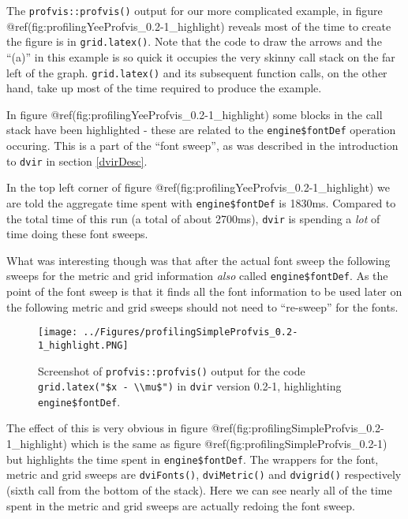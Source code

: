 \documentclass[]{article}
\begin{document}
The \texttt{profvis::profvis()} output for our more complicated example,
in figure @ref(fig:profilingYeeProfvis\_0.2-1\_highlight) reveals most
of the time to create the figure is in \texttt{grid.latex()}. Note that
the code to draw the arrows and the ``(a)'' in this example is so quick
it occupies the very skinny call stack on the far left of the graph.
\texttt{grid.latex()} and its subsequent function calls, on the other
hand, take up most of the time required to produce the example.

In figure @ref(fig:profilingYeeProfvis\_0.2-1\_highlight) some blocks in
the call stack have been highlighted - these are related to the
\texttt{engine\$fontDef} operation occuring. This is a part of the
``font sweep'', as was described in the introduction to \texttt{dvir} in
section \ref{dvirDesc}.

In the top left corner of figure
@ref(fig:profilingYeeProfvis\_0.2-1\_highlight) we are told the
aggregate time spent with \texttt{engine\$fontDef} is 1830ms. Compared
to the total time of this run (a total of about 2700ms), \texttt{dvir}
is spending a \emph{lot} of time doing these font sweeps.

What was interesting though was that after the actual font sweep the
following sweeps for the metric and grid information \emph{also} called
\texttt{engine\$fontDef}. As the point of the font sweep is that it
finds all the font information to be used later on the following metric
and grid sweeps should not need to ``re-sweep'' for the fonts.

\begin{figure}
\centering
\texttt{[image: ../Figures/profilingSimpleProfvis\_0.2-1\_highlight.PNG]}
\caption{Screenshot of \texttt{profvis::profvis()} output for the code
\texttt{grid.latex("\$x\ -\ \textbackslash{}\textbackslash{}mu\$")} in
\texttt{dvir} version 0.2-1, highlighting \texttt{engine\$fontDef}.}
\end{figure}

The effect of this is very obvious in figure
@ref(fig:profilingSimpleProfvis\_0.2-1\_highlight) which is the same as
figure @ref(fig:profilingSimpleProfvis\_0.2-1) but highlights the time
spent in \texttt{engine\$fontDef}. The wrappers for the font, metric and
grid sweeps are \texttt{dviFonts()}, \texttt{dviMetric()} and
\texttt{dvigrid()} respectively (sixth call from the bottom of the
stack). Here we can see nearly all of the time spent in the metric and
grid sweeps are actually redoing the font sweep.
\end{document}
